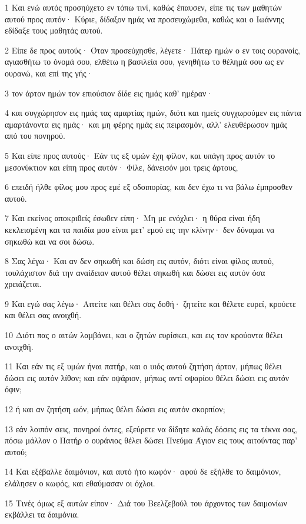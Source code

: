 \par 1 Και ενώ αυτός προσηύχετο εν τόπω τινί, καθώς έπαυσεν, είπε τις των μαθητών αυτού προς αυτόν· Κύριε, δίδαξον ημάς να προσευχώμεθα, καθώς και ο Ιωάννης εδίδαξε τους μαθητάς αυτού.
\par 2 Είπε δε προς αυτούς· Όταν προσεύχησθε, λέγετε· Πάτερ ημών ο εν τοις ουρανοίς, αγιασθήτω το όνομά σου, ελθέτω η βασιλεία σου, γενηθήτω το θέλημά σου ως εν ουρανώ, και επί της γής·
\par 3 τον άρτον ημών τον επιούσιον δίδε εις ημάς καθ' ημέραν·
\par 4 και συγχώρησον εις ημάς τας αμαρτίας ημών, διότι και ημείς συγχωρούμεν εις πάντα αμαρτάνοντα εις ημάς· και μη φέρης ημάς εις πειρασμόν, αλλ' ελευθέρωσον ημάς από του πονηρού.
\par 5 Και είπε προς αυτούς· Εάν τις εξ υμών έχη φίλον, και υπάγη προς αυτόν το μεσονύκτιον και είπη προς αυτόν· Φίλε, δάνεισόν μοι τρεις άρτους,
\par 6 επειδή ήλθε φίλος μου προς εμέ εξ οδοιπορίας, και δεν έχω τι να βάλω έμπροσθεν αυτού.
\par 7 Και εκείνος αποκριθείς έσωθεν είπη· Μη με ενόχλει· η θύρα είναι ήδη κεκλεισμένη και τα παιδία μου είναι μετ' εμού εις την κλίνην· δεν δύναμαι να σηκωθώ και να σοι δώσω.
\par 8 Σας λέγω· Και αν δεν σηκωθή και δώση εις αυτόν, διότι είναι φίλος αυτού, τουλάχιστον διά την αναίδειαν αυτού θέλει σηκωθή και δώσει εις αυτόν όσα χρειάζεται.
\par 9 Και εγώ σας λέγω· Αιτείτε και θέλει σας δοθή· ζητείτε και θέλετε ευρεί, κρούετε και θέλει σας ανοιχθή.
\par 10 Διότι πας ο αιτών λαμβάνει, και ο ζητών ευρίσκει, και εις τον κρούοντα θέλει ανοιχθή.
\par 11 Και εάν τις εξ υμών ήναι πατήρ, και ο υιός αυτού ζητήση άρτον, μήπως θέλει δώσει εις αυτόν λίθον; και εάν οψάριον, μήπως αντί οψαρίου θέλει δώσει εις αυτόν όφιν;
\par 12 ή και αν ζητήση ωόν, μήπως θέλει δώσει εις αυτόν σκορπίον;
\par 13 εάν λοιπόν σεις, πονηροί όντες, εξεύρετε να δίδητε καλάς δόσεις εις τα τέκνα σας, πόσω μάλλον ο Πατήρ ο ουράνιος θέλει δώσει Πνεύμα Άγιον εις τους αιτούντας παρ' αυτού;
\par 14 Και εξέβαλλε δαιμόνιον, και αυτό ήτο κωφόν· αφού δε εξήλθε το δαιμόνιον, ελάλησεν ο κωφός, και εθαύμασαν οι όχλοι.
\par 15 Τινές όμως εξ αυτών είπον· Διά του Βεελζεβούλ του άρχοντος των δαιμονίων εκβάλλει τα δαιμόνια.
